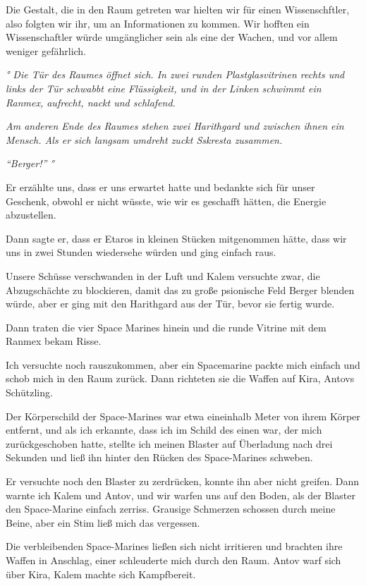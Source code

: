 \documentclass[11pt]{scrartcl}
\begin{document}
Die Gestalt, die in den Raum getreten war hielten wir für einen
Wissenschftler, also folgten wir ihr, um an Informationen zu kommen. Wir
hofften ein Wissenschaftler würde umgänglicher sein als eine der Wachen,
und vor allem weniger gefährlich.

\emph{° Die Tür des Raumes öffnet sich. In zwei runden Plastglasvitrinen
rechts und links der Tür schwabbt eine Flüssigkeit, und in der Linken
schwimmt ein Ranmex, aufrecht, nackt und schlafend.}

\emph{Am anderen Ende des Raumes stehen zwei Harithgard und zwischen
ihnen ein Mensch. Als er sich langsam umdreht zuckt Sskresta zusammen.}

\emph{``Berger!'' °}

Er erzählte uns, dass er uns erwartet hatte und bedankte sich für unser
Geschenk, obwohl er nicht wüsste, wie wir es geschafft hätten, die
Energie abzustellen.

Dann sagte er, dass er Etaros in kleinen Stücken mitgenommen hätte, dass
wir uns in zwei Stunden wiedersehe würden und ging einfach raus.

Unsere Schüsse verschwanden in der Luft und Kalem versuchte zwar, die
Abzugschächte zu blockieren, damit das zu große psionische Feld Berger
blenden würde, aber er ging mit den Harithgard aus der Tür, bevor sie
fertig wurde.

Dann traten die vier Space Marines hinein und die runde Vitrine mit dem
Ranmex bekam Risse.

Ich versuchte noch rauszukommen, aber ein Spacemarine packte mich
einfach und schob mich in den Raum zurück. Dann richteten sie die Waffen
auf Kira, Antovs Schützling.

Der Körperschild der Space-Marines war etwa eineinhalb Meter von ihrem
Körper entfernt, und als ich erkannte, dass ich im Schild des einen war,
der mich zurückgeschoben hatte, stellte ich meinen Blaster auf
Überladung nach drei Sekunden und ließ ihn hinter den Rücken des
Space-Marines schweben.

Er versuchte noch den Blaster zu zerdrücken, konnte ihn aber nicht
greifen. Dann warnte ich Kalem und Antov, und wir warfen uns auf den
Boden, als der Blaster den Space-Marine einfach zerriss. Grausige
Schmerzen schossen durch meine Beine, aber ein Stim ließ mich das
vergessen.

Die verbleibenden Space-Marines ließen sich nicht irritieren und
brachten ihre Waffen in Anschlag, einer schleuderte mich durch den Raum.
Antov warf sich über Kira, Kalem machte sich Kampfbereit.
\end{document}

